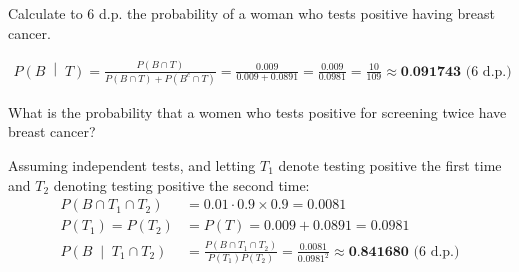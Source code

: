 \documentclass[12pt]{exam}
\begin{document}
\begin{questions}
\question Calculate to 6 d.p. the probability of a woman who tests positive having breast cancer.
\begin{tcolorbox}\vspace{-0.5cm}
\begin{align*}
    P\left(B\;\middle|\;T\right) = \frac{P(B \cap T)}{P(B\cap T) + P(B^c \cap T)} = \frac{0.009}{0.009 + 0.0891} = \frac{0.009}{0.0981} = \frac{10}{109} \approx \textbf{0.091743}\text{ (6 d.p.)}
\end{align*}
\end{tcolorbox}

\question What is the probability that a women who tests positive for screening twice have breast cancer?
\begin{tcolorbox}
Assuming independent tests, and letting $T_1$ denote testing positive the first time and $T_2$ denoting testing positive the second time:
\begin{align*}
    P(B \cap T_1 \cap T_2) &= 0.01 \cdot 0.9 \times 0.9 = 0.0081\\
    P(T_1) = P(T_2) &= P(T) = 0.009 + 0.0891 = 0.0981 \\
    P\left(B\;\middle|\;T_1\cap T_2\right) &= \frac{P(B \cap T_1 \cap T_2)}{P(T_1) P(T_2)} = \frac{0.0081}{0.0981^2} \approx \textbf{0.841680} \text{ (6 d.p.)}
\end{align*}
\end{tcolorbox}

\end{questions}
\vspace{-0.5cm}
\end{document}
